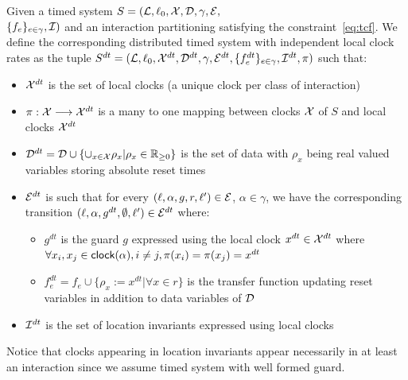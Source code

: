 \begin{definition}\label{def:drft}
Given a timed system $S=(\mathcal{L},\ell_0,\mathcal{X},\mathcal{D},\gamma,\mathcal{E},$\\$\{f_e\}_{e\in\gamma},\mathcal{I})$
and an interaction partitioning satisfying the constraint~\ref{eq:tcf}. 
We define the corresponding distributed timed system with independent local clock rates
as the tuple  
  $S^{dt}=(\mathcal{L},\ell_0,\mathcal{X}^{dt},\mathcal{D}^{dt},\gamma,\mathcal{E}^{dt},\{f_e^{dt}\}_{e\in\gamma},\mathcal{I}^{dt},\pi)$ 
such that:
\begin{itemize}
  \item $\mathcal{X}^{dt}$ is the set of local clocks (a unique clock per class of interaction) 
  \item $\pi:\mathcal{X}\longrightarrow\mathcal{X}^{dt}$ is a many to one mapping between clocks $\mathcal{X}$ of $S$ and local clocks 
    $\mathcal{X}^{dt}$
  \item $\mathcal{D}^{dt}=\mathcal{D}\cup\{\cup_{x\in\mathcal{X}}\rho_x|\rho_x\in\mathbb{R}_{\ge 0}\}$ is the set of data with 
    $\rho_x$ being real valued variables storing absolute reset times
  \item $\mathcal{E}^{dt}$ is such that for every $(\ell,\alpha,g,r,\ell')\in\mathcal{E}$, $\alpha\in\gamma$, we 
    have the corresponding transition $(\ell,\alpha,g^{dt},\emptyset,\ell')\in\mathcal{E}^{dt}$ where:
  \begin{itemize}
    \item $g^{dt}$ is the guard $g$ expressed using the local clock $x^{dt}\in\mathcal{X}^{dt}$ where
      $\forall x_i,x_j\in\textsf{clock}(\alpha),i\neq j,\pi(x_i)=\pi(x_j)=x^{dt}$
    \item $f_e^{dt}=f_e\cup\{\rho_x:=x^{dt}|\forall x\in r\}$ is the transfer function updating 
      reset variables in addition to data variables of $\mathcal{D}$
  \end{itemize}
  \item $\mathcal{I}^{dt}$ is the set of location invariants expressed using local clocks 
\end{itemize}
\end{definition}

Notice that clocks appearing in location invariants appear necessarily in at least an 
interaction since we assume timed system with well formed guard.

